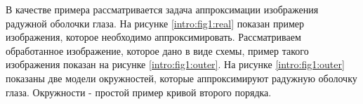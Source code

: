 В качестве примера рассматривается задача аппроксимации изображения радужной оболочки глаза. На рисунке \ref{intro:fig1:real} показан пример изображения, которое необходимо аппроксимировать. Рассматриваем обработанное изображение, которое дано в виде схемы, пример такого изображения показан на рисунке \ref{intro:fig1:outer}. На рисунке \ref{intro:fig1:outer} показаны две модели окружностей, которые аппроксимируют радужную оболочку глаза. Окружности - простой пример кривой второго порядка.

\begin{figure}[h!]
\center

\end{figure}
